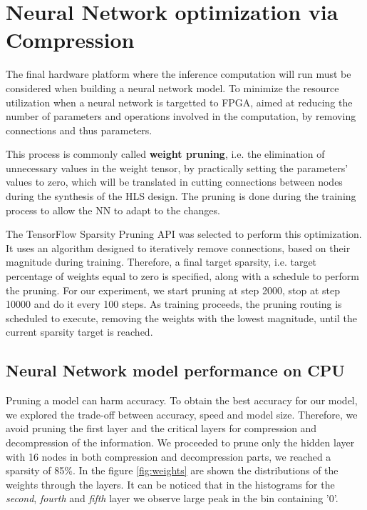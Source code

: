 \documentclass{article}
\begin{document}
\section{Neural Network optimization via Compression}

The final hardware platform where the inference computation will run must be considered when building a neural network model. 
To minimize the resource utilization when a neural network is targetted to FPGA, 
aimed at reducing the number of parameters and operations involved in the computation, 
by removing connections and thus parameters.

\par This process is commonly called \textbf{weight pruning}, i.e. the elimination of unnecessary values in the weight tensor, 
by practically setting the parameters' values to zero, which will be translated in cutting connections between nodes 
during the synthesis of the HLS design. 
The pruning is done during the training process to allow the NN to adapt to the changes.

\par The TensorFlow Sparsity Pruning API was selected to perform this optimization.
It uses an algorithm designed to iteratively remove connections, based on their magnitude during training.
Therefore, a final target sparsity, i.e. target percentage of weights equal to zero is specified,
along with a schedule to perform the pruning. 
For our experiment, we start pruning at step 2000, stop at step 10000 and do it every 100 steps.
As training proceeds, the pruning routing is scheduled to execute, removing the weights with the lowest magnitude, 
until the current sparsity target is reached.

\subsection{Neural Network model performance on CPU}

\par Pruning a model can harm accuracy. 
To obtain the best accuracy for our model, we explored the trade-off between accuracy, speed and model size.
Therefore, we avoid pruning the first layer and the critical layers for compression and decompression of the information.
We proceeded to prune only the hidden layer with 16 nodes in both compression and decompression parts, we reached a sparsity of 85\%. 
In the figure \ref{fig:weights} are shown the distributions of the weights through the layers.
It can be noticed that in the histograms for the \textit{second}, \textit{fourth} and \textit{fifth} layer we observe large peak in the bin containing '$0$'.
\end{document}
